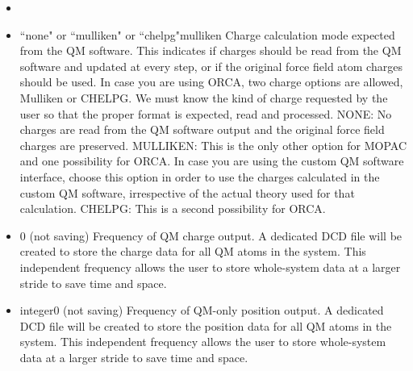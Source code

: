 \begin{itemize}
\item
{}

\item
{}%
{``none" or ``mulliken" or ``chelpg"}{mulliken}{%
Charge calculation mode expected from the QM software. This
indicates if charges should be read from the QM software and
updated at every step, or if the original force field atom
charges should be used. In case you are using ORCA, two charge
options are allowed, Mulliken or CHELPG. We must know the kind
of charge requested by the user so that the proper format is expected,
read and processed. NONE: No charges are read from the QM software
output and the original force field charges are preserved.
MULLIKEN: This is the only other option for MOPAC and one possibility
for ORCA. In case you are using the custom QM software interface,
choose this option in order to use the charges calculated in the
custom QM software, irrespective of the actual theory used for
that calculation. CHELPG: This is a second possibility for ORCA.
}

\item
{}%
{0 (not saving)}{%
Frequency of QM charge output. A dedicated DCD file will be created
to store the charge data for all QM atoms in the system. This
independent frequency allows the user to store whole-system data
at a larger stride to save time and space.
}

\item
{}%
{integer}{0 (not saving)}{%
Frequency of QM-only position output. A dedicated DCD file will be
created to store the position data for all QM atoms in the system.
This independent frequency allows the user to store whole-system
data at a larger stride to save time and space.
}

\end{itemize}


